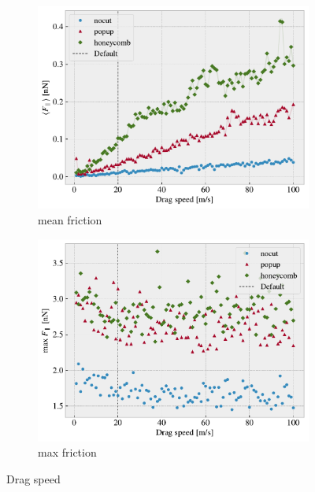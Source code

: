 \begin{figure}[H]
  \centering
  \begin{subfigure}[b]{0.49\textwidth}
      \centering
      \includegraphics[width=\textwidth]{figures/baseline/variables_vel_mean_fixmove.pdf}
      \caption{mean friction}
      \label{fig:var_vel_mean}
  \end{subfigure}
  \hfill
  \begin{subfigure}[b]{0.49\textwidth}
      \centering
      \includegraphics[width=\textwidth]{figures/baseline/variables_vel_max_fixmove.pdf}
      \caption{max friction}
      \label{fig:var_vel_max}
  \end{subfigure}
  \hfill
     \caption{Drag speed}
     \label{fig:var_vel}
\end{figure}


